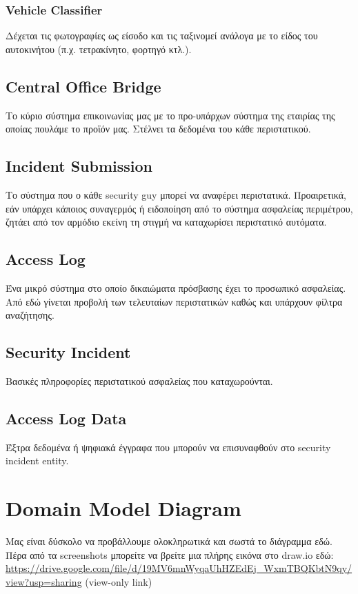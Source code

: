 \documentclass{article}
\begin{document}
\subsubsection{Vehicle Classifier}
Δέχεται τις φωτογραφίες ως είσοδο και τις ταξινομεί ανάλογα με το είδος του αυτοκινήτου (π.χ. τετρακίνητο, φορτηγό κτλ.).

\subsection{Central Office Bridge}
Το κύριο σύστημα επικοινωνίας μας με το προ-υπάρχων σύστημα της εταιρίας της οποίας πουλάμε το προϊόν μας. Στέλνει τα δεδομένα του κάθε περιστατικού.

\subsection{Incident Submission}
Το σύστημα που ο κάθε security guy μπορεί να αναφέρει περιστατικά. Προαιρετικά, εάν υπάρχει κάποιος συναγερμός ή ειδοποίηση από το σύστημα ασφαλείας περιμέτρου, ζητάει από τον αρμόδιο εκείνη τη στιγμή να καταχωρίσει περιστατικό αυτόματα.
\subsection{Access Log}
Ένα μικρό σύστημα στο οποίο δικαιώματα πρόσβασης έχει το προσωπικό ασφαλείας. Από εδώ γίνεται προβολή των τελευταίων περιστατικών καθώς και υπάρχουν φίλτρα αναζήτησης.
\subsection{Security Incident}
Βασικές πληροφορίες περιστατικού ασφαλείας που καταχωρούνται.
\subsection{Access Log Data}
Έξτρα δεδομένα ή ψηφιακά έγγραφα που μπορούν να επισυναφθούν στο security incident entity.

\section{Domain Model Diagram}
Μας είναι δύσκολο να προβάλλουμε ολοκληρωτικά και σωστά το διάγραμμα εδώ. Πέρα από τα screenshots μπορείτε να βρείτε μια πλήρης εικόνα στο draw.io εδώ:
\url{https://drive.google.com/file/d/19MV6mnWyqaUhHZEdEj_WxmTBQKbtN9qy/view?usp=sharing}
(view-only link)

\noindent{}
\newpage
\end{document}
